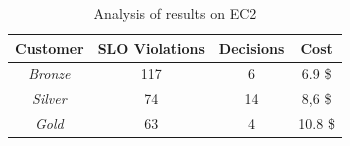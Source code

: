 






\begin{table}
  {\scriptsize 
\begin{center}
    \begin{tabular}{  | c | c | c | c |}
    \hline
         \textbf{Customer}  & \textbf{SLO Violations} & \textbf{Decisions}  & \textbf{Cost}  \\ \hline
   \textit{Bronze}   &  117 &  6 &  6.9 \$ \\ \hline   
   \textit{Silver}  &  74 &  14 &  8,6 \$ \\ \hline   
\textit{Gold} &   63  &  4 &  10.8 \$  \\ \hline   

 \end{tabular}
\end{center}
\vspace{-3mm}
\caption{Analysis of results on EC2}
\label{summaryEC2}
}
\end{table}




